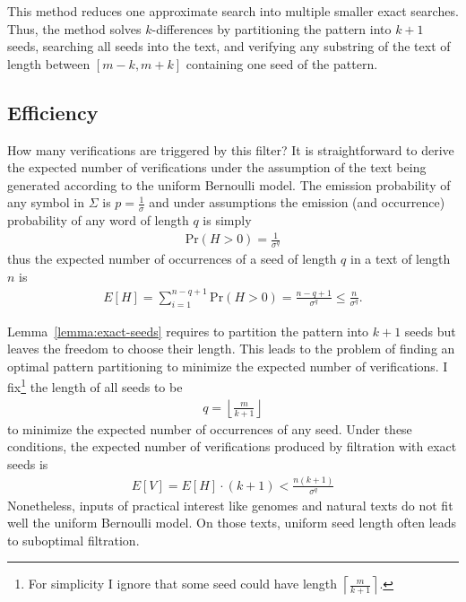 This method reduces one approximate search into multiple smaller exact searches.
Thus, the method solves $k$-differences by partitioning the pattern into $k+1$ seeds, searching all seeds into the text, and verifying any substring of the text of length between $[m - k, m + k]$ containing one seed of the pattern.




\subsection{Efficiency}
\label{sec:filtering:exact:efficiency}


How many verifications are triggered by this filter?
It is straightforward to derive the expected number of verifications under the assumption of the text being generated according to the uniform Bernoulli model.
The emission probability of any symbol in $\Sigma$ is $p = \frac{1}{\sigma}$ and under \iid assumptions the emission (and occurrence) probability of any word of length $q$ is simply
\begin{eqnarray}
\text{Pr}(H > 0) = \frac{1}{\sigma^q}
\end{eqnarray}
thus the expected number of occurrences of a seed of length $q$ in a text of length $n$ is
\begin{eqnarray}
E[H] = \sum_{i=1}^{n-q+1}{\text{Pr}(H > 0)} = \frac{n - q + 1}{\sigma^q} \leq \frac{n}{\sigma^q}.
\end{eqnarray}

Lemma~\ref{lemma:exact-seeds} requires to partition the pattern into $k+1$ seeds but leaves the freedom to choose their length.
This leads to the problem of finding an optimal pattern partitioning to minimize the expected number of verifications.
I fix\footnote{For simplicity I ignore that some seed could have length $\left \lceil \frac{m}{k+1} \right \rceil$.} the length of all seeds to be
\begin{eqnarray}
\label{eq:seed-len}
q=\left \lfloor \frac{m}{k+1} \right \rfloor
\end{eqnarray}
to minimize the expected number of occurrences of any seed.
Under these conditions, the expected number of verifications produced by filtration with exact seeds is
\begin{eqnarray}
E[V] = E[H] \cdot (k + 1) < \frac{n (k + 1)}{\sigma^q}
\end{eqnarray}
Nonetheless, inputs of practical interest like genomes and natural texts do not fit well the uniform Bernoulli model.
On those texts, uniform seed length often leads to suboptimal filtration.

